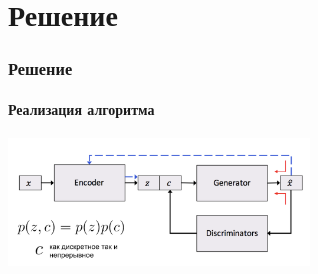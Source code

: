 \documentclass[10pt]{beamer}
\begin{document}
\begin{frame}

\end{frame}
\section{Решение}
\begin{frame}
\frametitle{Решение}
\framesubtitle{Реализация алгоритма}


\begin{center}
    \vskip-5mm
    \includegraphics[width=0.6\textwidth]{images/cvae.png}
\end{center}


\end{frame}
\end{document}
